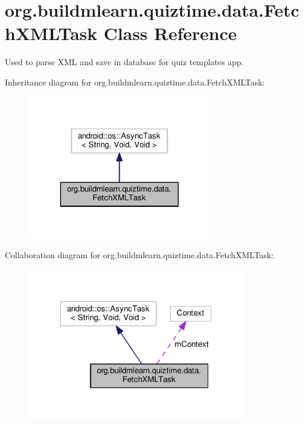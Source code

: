 \hypertarget{classorg_1_1buildmlearn_1_1quiztime_1_1data_1_1FetchXMLTask}{}\section{org.\+buildmlearn.\+quiztime.\+data.\+Fetch\+X\+M\+L\+Task Class Reference}
\label{classorg_1_1buildmlearn_1_1quiztime_1_1data_1_1FetchXMLTask}


Used to parse X\+ML and save in database for quiz template\textquotesingle{}s app.  




Inheritance diagram for org.\+buildmlearn.\+quiztime.\+data.\+Fetch\+X\+M\+L\+Task\+:
\nopagebreak
\begin{figure}[H]
\begin{center}
\leavevmode
\includegraphics[width=227pt]{classorg_1_1buildmlearn_1_1quiztime_1_1data_1_1FetchXMLTask__inherit__graph}
\end{center}
\end{figure}


Collaboration diagram for org.\+buildmlearn.\+quiztime.\+data.\+Fetch\+X\+M\+L\+Task\+:
\nopagebreak
\begin{figure}[H]
\begin{center}
\leavevmode
\includegraphics[width=269pt]{classorg_1_1buildmlearn_1_1quiztime_1_1data_1_1FetchXMLTask__coll__graph}
\end{center}
\end{figure}
